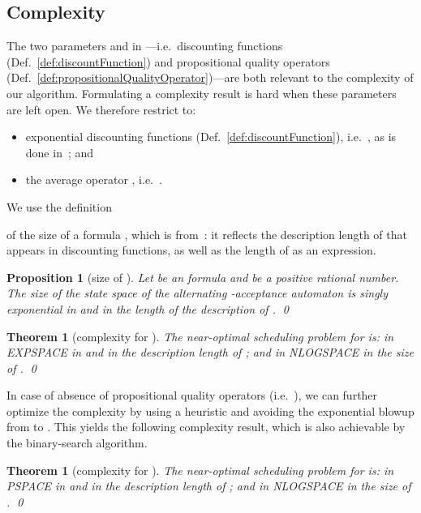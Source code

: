 \documentclass[a4paper,USenglish,numberwithinsect]{lipics}
\theoremstyle{definition}
\theoremstyle{remark}
\theoremstyle{plain}
\newtheorem{prop}[defi]{Proposition}
\newtheorem{thm}[defi]{Theorem}
\begin{document}
\subsection{Complexity}
\label{subsec:complexity}
The two parameters  and  in ---i.e.\ discounting functions
(Def.~\ref{def:discountFunction}) and propositional quality operators
(Def.~\ref{def:propositionalQualityOperator})---are both relevant to
 the  complexity of our algorithm. Formulating a
complexity result is hard when these parameters are left open.  We therefore
restrict to:
\begin{itemize}
 \item exponential discounting functions
(Def.~\ref{def:discountFunction}), i.e.\ , as is
       done
in~\cite{AlmagorBK14}; and
 \item the average operator , i.e.\ .
\end{itemize} 
We use the definition
  
of the size of a formula , which is from~\cite{AlmagorBK14}: it
reflects the description length of  that appears in
 discounting
functions, as well as the length of 
as an expression.



\begin{prop}[size of  ]\label{prop:sizeOfAltAutom}
  Let  be an  formula and 
 be a positive rational number.  The size of the state space of
 the alternating -acceptance automaton
  is singly exponential in  and in the length of the description of . \qed
\end{prop}
\begin{thm}[complexity for ] \label{thm:mainComplexity}
The near-optimal scheduling problem for  is: in
 EXPSPACE in  and in the description length of
 ; and in NLOGSPACE in the size of . 
\qed
\end{thm}

In case of absence of propositional quality operators
(i.e.\ ), we can further 
optimize the complexity by using a heuristic and  avoiding the exponential blowup  from 
 to  . This yields 
the following complexity result, which is also achievable by the
binary-search
algorithm.

\begin{thm}[complexity for ] \label{thm:mainComplexityWithoutPropositional}
The near-optimal scheduling problem for  is: in
 PSPACE in  and in the description length of
 ; and in NLOGSPACE in the size of . 
\qed
\end{thm}
\end{document}
